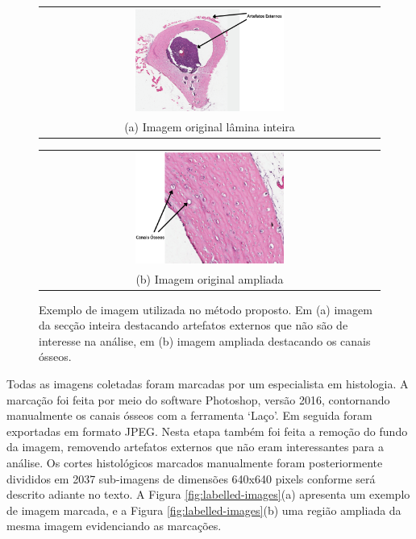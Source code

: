 \begin{figure}[h]
    \center
    \begin{tabular}{@{}c@{}}
        \includegraphics[width=0.45\textwidth]{figures/3_methods/imagem_original_inteira.png}
        \\[\abovecaptionskip]
    \small (a) Imagem original lâmina inteira
    \end{tabular}
    \begin{tabular}{@{}c@{}}
        \includegraphics[width=0.45\textwidth]{figures/3_methods/imagem_original_ampliada.png}
        \\[\abovecaptionskip]
    \small (b) Imagem original ampliada
    \end{tabular}
    
    \caption[Exemplo de imagem utilizada no método proposto.]{Exemplo de imagem utilizada no método proposto. Em (a) imagem da secção inteira destacando artefatos externos que não são de interesse na análise, em (b) imagem ampliada destacando os canais ósseos.} 
    \label{fig:original-images}
\end{figure}

Todas as imagens coletadas foram marcadas por um especialista em histologia. A marcação foi feita por meio do software Photoshop\textregistered, versão 2016, contornando manualmente os canais ósseos com a ferramenta `Laço'. Em seguida foram exportadas em formato JPEG. Nesta etapa também foi feita a remoção do fundo da imagem, removendo artefatos externos que não eram interessantes para a análise. Os cortes histológicos marcados manualmente foram posteriormente divididos em 2037 sub-imagens de dimensões 640x640 pixels conforme será descrito adiante no texto.
A Figura \ref{fig:labelled-images}(a) apresenta um exemplo de imagem marcada, e a Figura \ref{fig:labelled-images}(b) uma região ampliada da mesma imagem evidenciando as marcações. 


